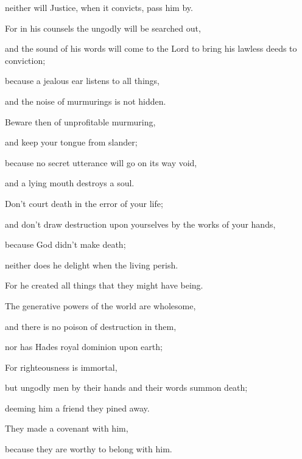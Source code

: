 {\par }{\QB {} neither will Justice, when it convicts, pass him by.
\par }{\Q {}For in his counsels the ungodly will be searched out,
\par }{\QB and the sound of his words will come to the Lord to bring his lawless deeds to conviction;
\par }{\Q {}because a jealous ear listens to all things,
\par }{\QB and the noise of murmurings is not hidden.
\par }{\Q {}Beware then of unprofitable murmuring,
\par }{\QB and keep your tongue from slander;
\par }{\QB because no secret utterance will go on its way void,
\par }{\QB and a lying mouth destroys a soul.
\par }{\Q {}Don’t court death in the error of your life;
\par }{\QB and don’t draw destruction upon yourselves by the works of your hands,
\par }{\QB {}because God didn’t make death;
\par }{\QB neither does he delight when the living perish.
\par }{\Q {}For he created all things that they might have being.
\par }{\QB {}The generative powers of the world are wholesome,
\par }{\QB and there is no poison of destruction in them,
\par }{\QB nor has Hades
 royal dominion upon earth;
\par }{\Q {}For righteousness is immortal,
\par }{\QB {}but ungodly men by their hands and their words summon
death;
\par }{\QB deeming him a friend they
 pined away.
\par }{\Q They made a covenant with him,
\par }{\QB because they are worthy to belong with him.
\par }{\BB \par }
